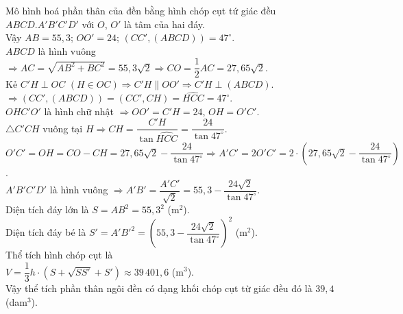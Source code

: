\begin{ex}
{		Mô hình hoá phần thân của đền bằng hình chóp cụt tứ giác đều $ABCD.A'B'C'D'$ với $O$, $O'$ là tâm  của hai đáy.\\ Vậy $AB=55{,}3$; $OO'=24$; $(CC',(ABCD))=47^{\circ}$.\\
		$ABCD$ là hình vuông 
		$\Rightarrow  AC=\sqrt{AB^2+BC^2}=55{,}3\sqrt{2}\Rightarrow CO=\dfrac{1}{2}AC=27{,}65\sqrt{2}$.\\
		Kẻ $C'H\perp OC\,\,(H\in OC)\Rightarrow  C'H\parallel OO'\Rightarrow C'H\perp(ABCD)$.\\
		$\Rightarrow(CC',(ABCD))=(CC',CH)=\widehat{HCC}=47^{\circ}$.\\ 
		$OHC'O'$  là hình chữ nhật $\Rightarrow OO'=C'H=24$, $OH=O'C'$.\\
		 $\triangle C'CH$ vuông tại $H\Rightarrow CH=\dfrac{C'H}{\tan\widehat{HCC}}=\dfrac{24}{\tan 47^{\circ}}$.\\
		 $O'C'=OH=CO-CH=27{,}65\sqrt{2}-\dfrac{24}{\tan 47^{\circ}}\Rightarrow A'C'=2O'C'=2\cdot\left(27{,}65\sqrt{2}-\dfrac{24}{\tan 47^{\circ}}\right)$.\\
		 $A'B'C'D'$ là hình vuông $\Rightarrow A'B'=\dfrac{A'C'}{\sqrt{2}}=55{,}3-\dfrac{24\sqrt{2}}{\tan 47^{\circ}}$.\\
		Diện tích đáy lớn  là $S=AB^2=55{,}3^2$ (m$^2$).\\
		Diện tích đáy bé là $S'=A'B'^2=\left(55{,}3-\dfrac{24\sqrt{2}}{\tan 47^{\circ}}\right)^2$  (m$^2$).\\
		Thể tích hình chóp cụt  là\\
		 $V=\dfrac{1}{3}h\cdot\left(S+\sqrt{SS'}+S'\right)\approx 39\,401{,}6
		$  (m$^3$).\\
		Vậy  thể tích phần thân ngôi đền có dạng khối chóp cụt từ giác đều đó là
		$39{,}4$ (dam$^3$). 
	 }
\end{ex}

